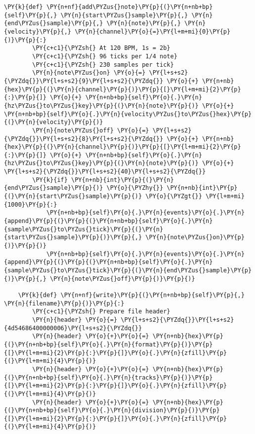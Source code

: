 \begin{Verbatim}[commandchars=\\\{\}]
    \PY{k}{def} \PY{n+nf}{add\PYZus{}note}\PY{p}{(}\PY{n+nb+bp}{self}\PY{p}{,} \PY{n}{start\PYZus{}sample}\PY{p}{,} \PY{n}{end\PYZus{}sample}\PY{p}{,} \PY{n}{note}\PY{p}{,} \PY{n}{velocity}\PY{p}{,} \PY{n}{channel}\PY{o}{=}\PY{l+m+mi}{0}\PY{p}{)}\PY{p}{:}
        \PY{c+c1}{\PYZsh{} At 120 BPM, 1s = 2b}
        \PY{c+c1}{\PYZsh{} 96 ticks per 1/4 note}
        \PY{c+c1}{\PYZsh{} 230 samples per tick}
        \PY{n}{note\PYZus{}on} \PY{o}{=} \PY{l+s+s2}{\PYZdq{}}\PY{l+s+s2}{9}\PY{l+s+s2}{\PYZdq{}} \PY{o}{+} \PY{n+nb}{hex}\PY{p}{(}\PY{n}{channel}\PY{p}{)}\PY{p}{[}\PY{l+m+mi}{2}\PY{p}{:}\PY{p}{]} \PY{o}{+} \PY{n+nb+bp}{self}\PY{o}{.}\PY{n}{hz\PYZus{}to\PYZus{}key}\PY{p}{(}\PY{n}{note}\PY{p}{)} \PY{o}{+} \PY{n+nb+bp}{self}\PY{o}{.}\PY{n}{velocity\PYZus{}to\PYZus{}hex}\PY{p}{(}\PY{n}{velocity}\PY{p}{)}
        \PY{n}{note\PYZus{}off} \PY{o}{=} \PY{l+s+s2}{\PYZdq{}}\PY{l+s+s2}{8}\PY{l+s+s2}{\PYZdq{}} \PY{o}{+} \PY{n+nb}{hex}\PY{p}{(}\PY{n}{channel}\PY{p}{)}\PY{p}{[}\PY{l+m+mi}{2}\PY{p}{:}\PY{p}{]} \PY{o}{+} \PY{n+nb+bp}{self}\PY{o}{.}\PY{n}{hz\PYZus{}to\PYZus{}key}\PY{p}{(}\PY{n}{note}\PY{p}{)} \PY{o}{+} \PY{l+s+s2}{\PYZdq{}}\PY{l+s+s2}{40}\PY{l+s+s2}{\PYZdq{}}
        \PY{k}{if} \PY{n+nb}{int}\PY{p}{(}\PY{n}{end\PYZus{}sample}\PY{p}{)} \PY{o}{\PYZhy{}} \PY{n+nb}{int}\PY{p}{(}\PY{n}{start\PYZus{}sample}\PY{p}{)} \PY{o}{\PYZgt{}} \PY{l+m+mi}{1000}\PY{p}{:}
            \PY{n+nb+bp}{self}\PY{o}{.}\PY{n}{events}\PY{o}{.}\PY{n}{append}\PY{p}{(}\PY{p}{(}\PY{n+nb+bp}{self}\PY{o}{.}\PY{n}{sample\PYZus{}to\PYZus{}tick}\PY{p}{(}\PY{n}{start\PYZus{}sample}\PY{p}{)}\PY{p}{,} \PY{n}{note\PYZus{}on}\PY{p}{)}\PY{p}{)}
            \PY{n+nb+bp}{self}\PY{o}{.}\PY{n}{events}\PY{o}{.}\PY{n}{append}\PY{p}{(}\PY{p}{(}\PY{n+nb+bp}{self}\PY{o}{.}\PY{n}{sample\PYZus{}to\PYZus{}tick}\PY{p}{(}\PY{n}{end\PYZus{}sample}\PY{p}{)}\PY{p}{,} \PY{n}{note\PYZus{}off}\PY{p}{)}\PY{p}{)}

    \PY{k}{def} \PY{n+nf}{write}\PY{p}{(}\PY{n+nb+bp}{self}\PY{p}{,} \PY{n}{filename}\PY{p}{)}\PY{p}{:}
        \PY{c+c1}{\PYZsh{} Prepare file header}
        \PY{n}{header} \PY{o}{=} \PY{l+s+s2}{\PYZdq{}}\PY{l+s+s2}{4d54686400000006}\PY{l+s+s2}{\PYZdq{}}
        \PY{n}{header} \PY{o}{+}\PY{o}{=} \PY{n+nb}{hex}\PY{p}{(}\PY{n+nb+bp}{self}\PY{o}{.}\PY{n}{format}\PY{p}{)}\PY{p}{[}\PY{l+m+mi}{2}\PY{p}{:}\PY{p}{]}\PY{o}{.}\PY{n}{zfill}\PY{p}{(}\PY{l+m+mi}{4}\PY{p}{)}
        \PY{n}{header} \PY{o}{+}\PY{o}{=} \PY{n+nb}{hex}\PY{p}{(}\PY{n+nb+bp}{self}\PY{o}{.}\PY{n}{tracks}\PY{p}{)}\PY{p}{[}\PY{l+m+mi}{2}\PY{p}{:}\PY{p}{]}\PY{o}{.}\PY{n}{zfill}\PY{p}{(}\PY{l+m+mi}{4}\PY{p}{)}
        \PY{n}{header} \PY{o}{+}\PY{o}{=} \PY{n+nb}{hex}\PY{p}{(}\PY{n+nb+bp}{self}\PY{o}{.}\PY{n}{division}\PY{p}{)}\PY{p}{[}\PY{l+m+mi}{2}\PY{p}{:}\PY{p}{]}\PY{o}{.}\PY{n}{zfill}\PY{p}{(}\PY{l+m+mi}{4}\PY{p}{)}


\end{Verbatim}
